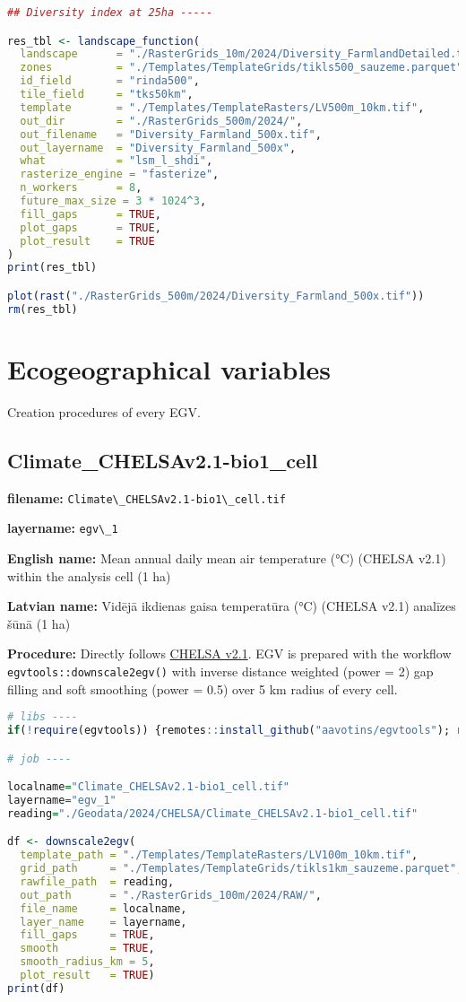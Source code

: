 \documentclass[
]{book}
\newcommand{\passthrough}[1]{#1}
\begin{document}
\begin{lstlisting}[language=R]
## Diversity index at 25ha -----

res_tbl <- landscape_function(
  landscape      = "./RasterGrids_10m/2024/Diversity_FarmlandDetailed.tif",
  zones          = "./Templates/TemplateGrids/tikls500_sauzeme.parquet",
  id_field       = "rinda500",
  tile_field     = "tks50km",
  template       = "./Templates/TemplateRasters/LV500m_10km.tif",
  out_dir        = "./RasterGrids_500m/2024/",
  out_filename   = "Diversity_Farmland_500x.tif",
  out_layername  = "Diversity_Farmland_500x",
  what           = "lsm_l_shdi",
  rasterize_engine = "fasterize",
  n_workers      = 8,
  future_max_size = 3 * 1024^3,
  fill_gaps      = TRUE,
  plot_gaps      = TRUE,
  plot_result    = TRUE
)
print(res_tbl)

plot(rast("./RasterGrids_500m/2024/Diversity_Farmland_500x.tif"))
rm(res_tbl)
\end{lstlisting}

\chapter{Ecogeographical variables}\label{Ch06}

Creation procedures of every EGV.

\section{Climate\_CHELSAv2.1-bio1\_cell}\label{ch06.001}

\textbf{filename:} \passthrough{\lstinline!Climate\_CHELSAv2.1-bio1\_cell.tif!}

\textbf{layername:} \passthrough{\lstinline!egv\_1!}

\textbf{English name:} Mean annual daily mean air temperature (°C) (CHELSA v2.1) within the analysis cell (1 ha)

\textbf{Latvian name:} Vidējā ikdienas gaisa temperatūra (°C) (CHELSA v2.1) analīzes šūnā (1 ha)

\textbf{Procedure:} Directly follows \hyperref[Ch04.11]{CHELSA v2.1}. EGV is prepared with the
workflow \passthrough{\lstinline!egvtools::downscale2egv()!} with inverse distance weighted (power = 2)
gap filling and soft smoothing (power = 0.5) over 5 km radius of every cell.

\begin{lstlisting}[language=R]
# libs ----
if(!require(egvtools)) {remotes::install_github("aavotins/egvtools"); require(egvtools)}

# job ----

localname="Climate_CHELSAv2.1-bio1_cell.tif"
layername="egv_1"
reading="./Geodata/2024/CHELSA/Climate_CHELSAv2.1-bio1_cell.tif"

df <- downscale2egv(
  template_path = "./Templates/TemplateRasters/LV100m_10km.tif",
  grid_path     = "./Templates/TemplateGrids/tikls1km_sauzeme.parquet",
  rawfile_path  = reading,
  out_path      = "./RasterGrids_100m/2024/RAW/",
  file_name     = localname,
  layer_name    = layername,
  fill_gaps     = TRUE,
  smooth        = TRUE,
  smooth_radius_km = 5,
  plot_result   = TRUE)
print(df)
\end{lstlisting}
\end{document}
